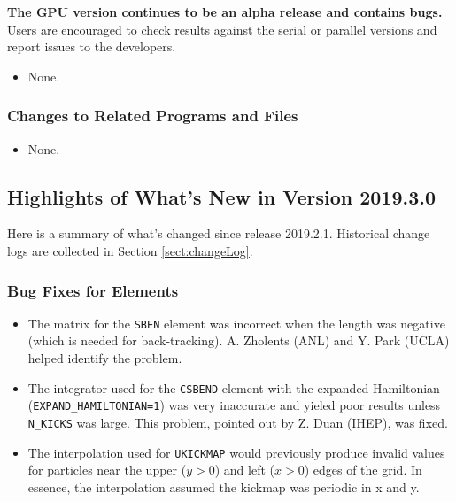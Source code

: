 \documentclass[11pt]{article}
\begin{document}
{\bf The GPU version continues to be an alpha release and contains bugs.}
Users are encouraged to check results against the serial or parallel versions and report issues to the developers.

\begin{itemize}
\item None.
\end{itemize}

\subsubsection{Changes to Related Programs and Files}

\begin{itemize}
\item None.
\end{itemize}


\subsection{Highlights of What's New in Version 2019.3.0}

Here is a summary of what's changed since release 2019.2.1.
Historical change logs are collected in Section \ref{sect:changeLog}.

\subsubsection{Bug Fixes for Elements}

\begin{itemize}
\item The matrix for the \verb|SBEN| element was incorrect when the length was negative (which is needed for
  back-tracking). A. Zholents (ANL) and Y. Park (UCLA) helped identify the problem.
\item The integrator used for the \verb|CSBEND| element with the expanded Hamiltonian (\verb|EXPAND_HAMILTONIAN=1|)
  was very inaccurate and yieled poor results unless \verb|N_KICKS| was large. This problem, pointed out by Z. Duan (IHEP),
  was fixed.
\item The interpolation used for \verb|UKICKMAP| would previously produce invalid values for particles near the upper ($y>0$) and
  left ($x>0$) edges of the grid. In essence, the interpolation assumed the kickmap was periodic in x and y.
\end{itemize}
\end{document}
